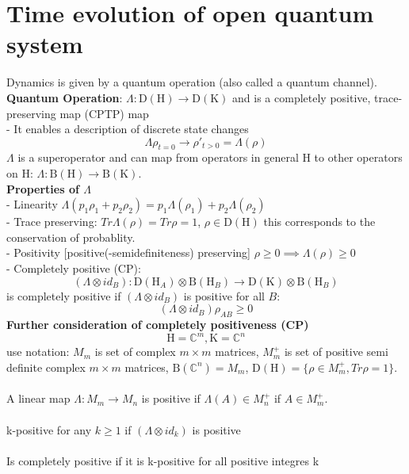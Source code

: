 \documentclass{article}
\begin{document}
\section{Time evolution of open quantum system}
Dynamics is given by a quantum operation (also called a quantum channel).\\
\textbf{Quantum Operation}: $\Lambda: \mathrm{D}(\mathrm{H}) \rightarrow \mathrm{D}(\mathrm{K})$ and is a completely positive, trace-preserving map (CPTP) map\\
- It enables a description of discrete state changes
$$
\Lambda \rho_{t=0} \rightarrow \rho'_{t>0} = \Lambda(\rho)
$$
$\Lambda$ is a superoperator and can map from operators in general $\mathrm{H}$ to other operators on $\mathrm{H}$: $\Lambda: \mathrm{B}(\mathrm{H}) \rightarrow \mathrm{B}(\mathrm{K})$.\\
\textbf{Properties of $\Lambda$}\\
- Linearity $\Lambda(p_1 \rho_1 + p_2 \rho_2) = p_1 \Lambda (\rho_1) + p_2 \Lambda(\rho_2)$\\
- Trace preserving: $Tr \Lambda(\rho) = Tr \rho = 1$, $\rho \in \mathrm{D}(\mathrm{H})$ this corresponds to the conservation of probablity.\\
- Positivity [positive(-semidefiniteness) preserving] $\rho \geq 0 \implies \Lambda(\rho) \geq 0$\\
- Completely positive (CP):
$$
(\Lambda \otimes id_B): \mathrm{D}(\mathrm{H}_A)\otimes\mathrm{B}(\mathrm{H}_B) \rightarrow \mathrm{D}(\mathrm{K})\otimes\mathrm{B}(\mathrm{H}_B)
$$
is completely positive if $(\Lambda \otimes id_B)$ is positive for all $B$:
$$
(\Lambda \otimes id_B)\rho_{AB} \geq 0
$$
\textbf{Further consideration of completely positiveness (CP)}\\
$$
\mathrm{H} = \mathbb{C}^m, \mathrm{K} = \mathbb{C}^n
$$
use notation: $M_m$ is set of complex $m \times m$ matrices, $M^+_m$ is set of positive semi definite complex $m \times m$ matrices, $\mathrm{B}(\mathbb{C}^n) = M_m$, $\mathrm{D}(\mathrm{H}) = \{ \rho \in M^+_m , Tr \rho = 1\}$. \\\\
A linear map $\Lambda: M_m \rightarrow M_n$ is positive if $\Lambda(A) \in M^+_n $ if $A \in M^+_m$.\\\\
k-positive for any $k \geq 1$ if $(\Lambda \otimes id_k)$ is positive\\\\
Is completely positive if it is k-positive for all positive integres k\\
\end{document}
